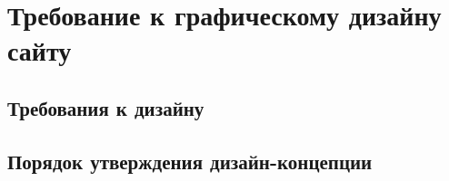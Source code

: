 \section{Требование к графическому дизайну сайту}
\subsection{Требования к дизайну}

\subsection{Порядок утверждения дизайн-концепции}
